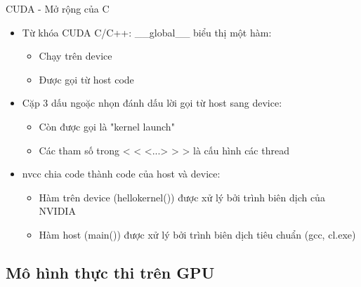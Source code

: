 \documentclass[10pt]{beamer}
\theoremstyle{remark}
\numberwithin{algocf}{section}
\numberwithin{equation}{section}
\numberwithin{dl}{section}
\numberwithin{figure}{section}
\begin{document}
\begin{frame}{CUDA - Mở rộng của C}
    \begin{itemize}
        \item Từ khóa CUDA C/C++: \_\_global\_\_ biểu thị một hàm:
        \begin{itemize}
            \item Chạy trên device 
            \item Được gọi từ host code
        \end{itemize}
        \item Cặp 3 dấu ngoặc nhọn đánh dấu lời gọi từ host sang device:
        \begin{itemize}
            \item Còn được gọi là "kernel launch"
            \item Các tham số trong < < <...> > > là cấu hình các thread
        \end{itemize}
        \item nvcc chia code thành code của host và device:
        \begin{itemize}
            \item Hàm trên device (hellokernel()) được xử lý bởi trình biên dịch của NVIDIA
            \item Hàm host (main()) được xử lý bởi trình biên dịch tiêu chuẩn (gcc, cl.exe)
        \end{itemize}
    \end{itemize}
\end{frame}

\subsection{Mô hình thực thi trên GPU}
\end{document}
